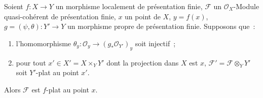 \begin{proposition}[11.5.3]
\label{IV.11.5.3-fr}
Soient $f:X\to Y$ un morphisme localement de présentation finie,
$\mathcal F$ un $\mathcal O_X$-Module quasi-cohérent de présentation finie, $x$
un point de $X$, $y=f(x)$, $g=(\psi,\theta):Y'\to Y$ un morphisme propre de
présentation finie. Supposons que~:
\begin{enumerate}[label=(\roman*)]
  \item l'homomorphisme $\theta_y:\mathcal O_y\to
  (g_*\mathcal O_{Y'})_y$ soit injectif~;
  \item pour tout $x'\in X'=X\times_Y Y'$ dont la projection dans $X$ est $x$,
  $\mathcal F'=\mathcal F\otimes_Y Y'$ soit $Y'$-plat au point $x'$.
\end{enumerate}
Alors $\mathcal F$ est $f$-plat au point $x$.
\end{proposition}

